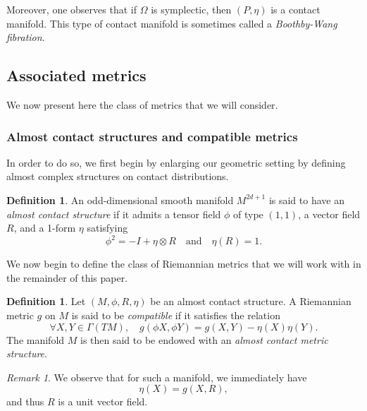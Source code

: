 \documentclass[12pt,a4paper]{amsart}
\theoremstyle{plain}
\theoremstyle{definition}
\newtheorem{definition}[theorem]{Definition}
\theoremstyle{remark}
\newtheorem{remark}[theorem]{Remark}
\numberwithin{equation}{section}
\theoremstyle{definition}
\numberwithin{equation}{section}
\begin{document}
Moreover, one observes that if $\Omega$ is symplectic, then $(P,\eta)$ is a contact manifold. This type of contact manifold is sometimes called a \emph{Boothby-Wang fibration}.

\subsection{Associated metrics}
\label{subsect:associatedmetrics}

We now present here the class of metrics that we will consider.

\subsubsection{Almost contact structures and compatible metrics}
\label{subsubsect:almostcontactstruct}

In order to do so, we first begin by enlarging our geometric setting by defining almost complex structures on contact distributions.

\begin{definition}
 \label{def:almostcontactstruct}
 An odd-dimensional smooth manifold $M^{2d+1}$ is said to have an \emph{almost contact structure} if it admits a tensor 
 field $\phi$ of type $(1,1)$, a vector field $R$, and a 1-form $\eta$ satisfying
 \begin{equation*}
 \phi^2 = -I+ \eta\otimes R\quad\mbox{and}\quad \eta(R)=1.
 \end{equation*}
\end{definition}

We now begin to define the class of Riemannian metrics that we will work with in the remainder of this paper.

\begin{definition}
 \label{def:almostcontactmetricstruct}
 Let $(M,\phi,R,\eta)$ be an almost contact structure. A Riemannian metric $g$ on $M$ is said to 
 be \emph{compatible} if it satisfies the relation 
 \begin{equation}
 \label{eq:compatiblemetric}
 \forall X,Y\in \Gamma(T M),\quad g(\phi X,\phi Y) = g(X,Y)-\eta(X)\eta(Y).
 \end{equation}
 The manifold $M$ is then said to be endowed with an \emph{almost contact metric structure}.
\end{definition}

\begin{remark}
We observe that for such a manifold, we immediately have
\begin{equation*}
 \eta(X) = g(X,R),
\end{equation*}
and thus $R$ is a unit vector field.
\end{remark}
\end{document}

